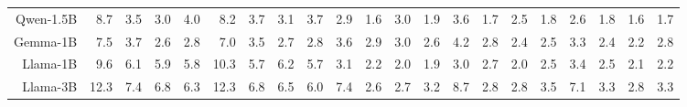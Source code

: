 \documentclass[letterpaper]{article}
\begin{document}
\begin{table}[t]
{\begin{tabular}{rrrrr|rrrr|rrrr|rrrr|rrrr}
Qwen-1.5B & \cellcolor[HTML]{FEEFCC}8.7 & \cellcolor[HTML]{FAD7CC}3.5 & \cellcolor[HTML]{FAD5CC}3.0 & \cellcolor[HTML]{FADACC}4.0 & \cellcolor[HTML]{FEECCC}8.2 & \cellcolor[HTML]{FAD8CC}3.7 & \cellcolor[HTML]{FAD5CC}3.1 & \cellcolor[HTML]{FAD8CC}3.7 & \cellcolor[HTML]{FCDFCC}2.9 & \cellcolor[HTML]{F9D4CC}1.6 & \cellcolor[HTML]{FCE1CC}3.0 & \cellcolor[HTML]{FAD7CC}1.9 & \cellcolor[HTML]{FCE4CC}3.6 & \cellcolor[HTML]{FAD7CC}1.7 & \cellcolor[HTML]{FBDDCC}2.5 & \cellcolor[HTML]{FAD7CC}1.8 & \cellcolor[HTML]{FBDECC}2.6 & \cellcolor[HTML]{FAD8CC}1.8 & \cellcolor[HTML]{FAD5CC}1.6 & \cellcolor[HTML]{FAD6CC}1.7 \\
Gemma-1B & \cellcolor[HTML]{FDEACC}7.5 & \cellcolor[HTML]{FAD8CC}3.7 & \cellcolor[HTML]{F9D3CC}2.6 & \cellcolor[HTML]{F9D4CC}2.8 & \cellcolor[HTML]{FDE7CC}7.0 & \cellcolor[HTML]{FAD7CC}3.5 & \cellcolor[HTML]{F9D3CC}2.7 & \cellcolor[HTML]{F9D4CC}2.8 & \cellcolor[HTML]{FDE6CC}3.6 & \cellcolor[HTML]{FCE0CC}2.9 & \cellcolor[HTML]{FCE1CC}3.0 & \cellcolor[HTML]{FBDDCC}2.6 & \cellcolor[HTML]{FDE8CC}4.2 & \cellcolor[HTML]{FBDFCC}2.8 & \cellcolor[HTML]{FBDBCC}2.4 & \cellcolor[HTML]{FBDCCC}2.5 & \cellcolor[HTML]{FCE3CC}3.3 & \cellcolor[HTML]{FBDCCC}2.4 & \cellcolor[HTML]{FBDACC}2.2 & \cellcolor[HTML]{FCDFCC}2.8 \\
Llama-1B & \cellcolor[HTML]{FDF2CC}9.6 & \cellcolor[HTML]{FCE3CC}6.1 & \cellcolor[HTML]{FCE2CC}5.9 & \cellcolor[HTML]{FCE2CC}5.8 & \cellcolor[HTML]{FBF1CC}10.3 & \cellcolor[HTML]{FCE1CC}5.7 & \cellcolor[HTML]{FCE3CC}6.2 & \cellcolor[HTML]{FCE1CC}5.7 & \cellcolor[HTML]{FCE1CC}3.1 & \cellcolor[HTML]{FAD9CC}2.2 & \cellcolor[HTML]{FAD8CC}2.0 & \cellcolor[HTML]{FAD7CC}1.9 & \cellcolor[HTML]{FCE0CC}3.0 & \cellcolor[HTML]{FBDECC}2.7 & \cellcolor[HTML]{FAD8CC}2.0 & \cellcolor[HTML]{FBDCCC}2.5 & \cellcolor[HTML]{FCE4CC}3.4 & \cellcolor[HTML]{FBDDCC}2.5 & \cellcolor[HTML]{FBDACC}2.1 & \cellcolor[HTML]{FBDBCC}2.2 \\
Llama-3B & \cellcolor[HTML]{EDEECC}12.3 & \cellcolor[HTML]{FDE9CC}7.4 & \cellcolor[HTML]{FDE6CC}6.8 & \cellcolor[HTML]{FCE4CC}6.3 & \cellcolor[HTML]{EFEFCC}12.3 & \cellcolor[HTML]{FDE6CC}6.8 & \cellcolor[HTML]{FDE4CC}6.5 & \cellcolor[HTML]{FCE2CC}6.0 & \cellcolor[HTML]{E3ECCC}7.4 & \cellcolor[HTML]{FBDDCC}2.6 & \cellcolor[HTML]{FBDDCC}2.7 & \cellcolor[HTML]{FCE2CC}3.2 & \cellcolor[HTML]{E0ECCC}8.7 & \cellcolor[HTML]{FBDECC}2.8 & \cellcolor[HTML]{FBDFCC}2.8 & \cellcolor[HTML]{FCE4CC}3.5 & \cellcolor[HTML]{E9EECC}7.1 & \cellcolor[HTML]{FCE3CC}3.3 & \cellcolor[HTML]{FCE0CC}2.8 & \cellcolor[HTML]{FCE4CC}3.3 \\

\end{tabular}}
\end{table}
\end{document}
